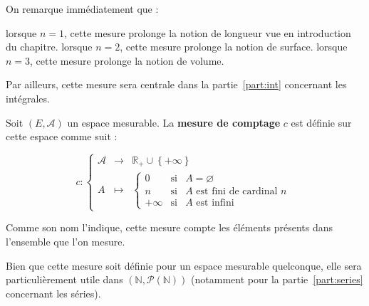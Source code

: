 \documentclass[../integ-proba.tex]{subfiles}
\begin{document}
  \begin{rem}
    On remarque immédiatement que :
    \begin{itemize}
      \itemb lorsque $n=1$, cette mesure prolonge la notion de longueur vue en introduction du chapitre.
      \itemb lorsque $n=2$, cette mesure prolonge la notion de surface.
      \itemb lorsque $n=3$, cette mesure prolonge la notion de volume.
    \end{itemize}

    Par ailleurs, cette mesure sera centrale dans la partie~\ref{part:int} concernant les intégrales.
  \end{rem}

  \begin{defi}
    Soit $\left(E,\mathcal{A}\right)$ un espace mesurable.
    La \textbf{mesure de comptage} $c$ est définie sur cette espace comme suit :

    \begin{displaymath}
      c :
    \left\{
    \begin{array}{ccc}
      \mathcal{A} & \longrightarrow & \mathbb{R}_+\cup\left\{+\infty\right\}\\
      A &                                   \longmapsto    &
        \left\{
        \begin{array}{rcl}
          0 & \text{si} & A = \varnothing\\
          n & \text{si} & A \text{ est fini de cardinal } n\\
          +\infty & \text{si} & A \text{ est infini}
        \end{array}
        \right.
    \end{array}
    \right.
    \end{displaymath}
  \end{defi}

  \begin{rem}
    Comme son nom l'indique, cette mesure compte les éléments présents dans l'ensemble que l'on mesure.
  \end{rem}

  \begin{rem}
    Bien que cette mesure soit définie pour un espace mesurable quelconque, elle sera particulièrement utile dans $\left(\mathbb{N},\mathcal{P}\left(\mathbb{N}\right)\right)$ (notamment pour la partie~\ref{part:series} concernant les séries).
  \end{rem}
\end{document}
